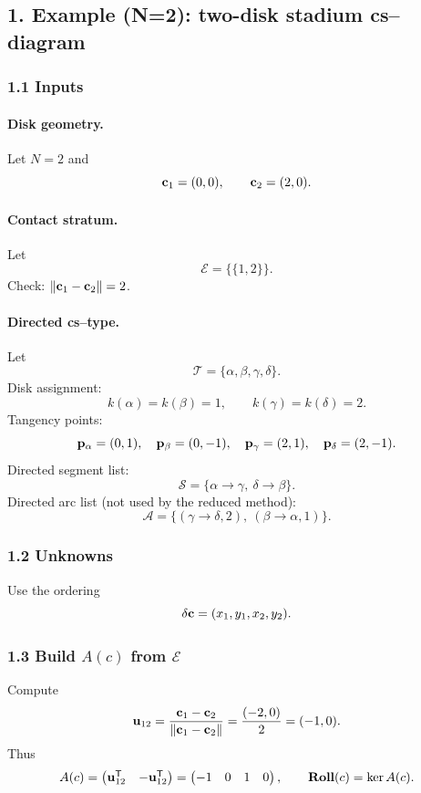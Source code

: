 \documentclass[12pt,letterpaper]{amsart}
\theoremstyle{definition}
\theoremstyle{remark}
\newcommand{\Roll}{\text{\rm \bf Roll}}
\begin{document}
\subsection{1. Example (N=2): two-disk stadium cs--diagram}

\subsubsection*{1.1 Inputs}

\paragraph{Disk geometry.}
Let $N=2$ and
\[
{\bf c}_1=(0,0),\qquad {\bf c}_2=(2,0).
\]

\paragraph{Contact stratum.}
Let
\[
\mathcal E=\{\{1,2\}\}.
\]
Check: $\|{\bf c}_1-{\bf c}_2\|=2$.

\paragraph{Directed cs--type.}
Let
\[
\mathcal T=\{\alpha,\beta,\gamma,\delta\}.
\]
Disk assignment:
\[
k(\alpha)=k(\beta)=1,\qquad k(\gamma)=k(\delta)=2.
\]
Tangency points:
\[
{\bf p}_\alpha=(0,1),\quad {\bf p}_\beta=(0,-1),\quad
{\bf p}_\gamma=(2,1),\quad {\bf p}_\delta=(2,-1).
\]
Directed segment list:
\[
\mathcal S=\{\alpha\to\gamma,\ \delta\to\beta\}.
\]
Directed arc list (not used by the reduced method):
\[
\mathcal A=\{(\gamma\to\delta,2),\ (\beta\to\alpha,1)\}.
\]

\subsubsection*{1.2 Unknowns}

Use the ordering
\[
\delta{\bf c}=(x_1,y_1,x_2,y_2).
\]

\subsubsection*{1.3 Build $A(c)$ from $\mathcal E$}

Compute
\[
{\bf u}_{12}=\frac{{\bf c}_1-{\bf c}_2}{\|{\bf c}_1-{\bf c}_2\|}
=\frac{(-2,0)}{2}=(-1,0).
\]
Thus
\[
A(c)=\begin{pmatrix} {\bf u}_{12}^\mathsf T & -{\bf u}_{12}^\mathsf T \end{pmatrix}
=\begin{pmatrix} -1 & 0 & 1 & 0 \end{pmatrix},
\qquad
\Roll(c)=\ker A(c).
\]
\end{document}
